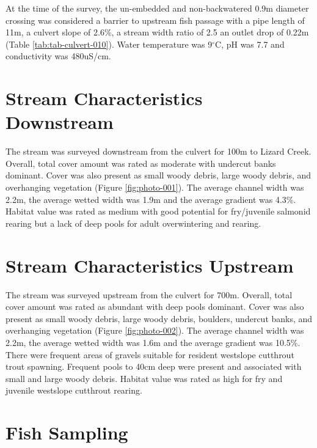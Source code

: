 \documentclass[
]{book}
\begin{document}
At the time of the survey, the un-embedded and non-backwatered 0.9m diameter crossing was considered a barrier to upstream fish passage with a pipe length of 11m, a culvert slope of 2.6\%, a stream width ratio of 2.5 an outlet drop of 0.22m (Table \ref{tab:tab-culvert-010}). Water temperature was 9\(^\circ\)C, pH was 7.7 and conductivity was 480uS/cm.

\hypertarget{stream-characteristics-downstream}{%
\section*{Stream Characteristics Downstream}\label{stream-characteristics-downstream}}

The stream was surveyed downstream from the culvert for 100m to Lizard Creek. Overall, total cover amount was rated as moderate with undercut banks dominant. Cover was also present as small woody debris, large woody debris, and overhanging vegetation (Figure \ref{fig:photo-001}). The average channel width was 2.2m, the average wetted width was 1.9m and the average gradient was 4.3\%. Habitat value was rated as medium with good potential for fry/juvenile salmonid rearing but a lack of deep pools for adult overwintering and rearing.

\hypertarget{stream-characteristics-upstream}{%
\section*{Stream Characteristics Upstream}\label{stream-characteristics-upstream}}

The stream was surveyed upstream from the culvert for 700m. Overall, total cover amount was rated as abundant with deep pools dominant. Cover was also present as small woody debris, large woody debris, boulders, undercut banks, and overhanging vegetation (Figure \ref{fig:photo-002}). The average channel width was 2.2m, the average wetted width was 1.6m and the average gradient was 10.5\%. There were frequent areas of gravels suitable for resident westslope cutthrout trout spawning. Frequent pools to 40cm deep were present and associated with small and large woody debris. Habitat value was rated as high for fry and juvenile westslope cutthrout rearing.

\hypertarget{fish-sampling}{%
\section*{Fish Sampling}\label{fish-sampling}}
\end{document}
